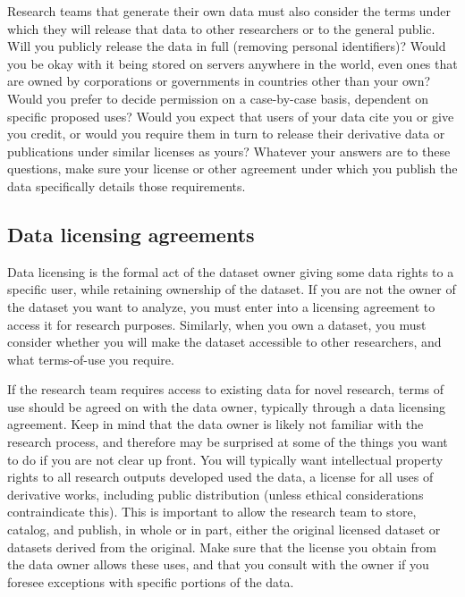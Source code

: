 Research teams that generate their own data must also consider the terms
under which they will release that data to other researchers or to the general public. 
Will you publicly release the data in full (removing personal identifiers)?
Would you be okay with it being stored on servers anywhere in the world,
even ones that are owned by corporations or governments in countries other than your own?
Would you prefer to decide permission on a case-by-case basis, dependent on specific proposed uses? 
Would you expect that users of your data cite you or give you credit,
or would you require them in turn to release
their derivative data or publications under similar licenses as yours?
Whatever your answers are to these questions,
make sure your license or other agreement
under which you publish the data
specifically details those requirements.

\subsection{Data licensing agreements}
Data licensing is the formal act of the dataset owner giving some data rights to a specific user,
while retaining ownership of the dataset.
If you are not the owner of the dataset you want to analyze,
you must enter into a licensing agreement to access it for research purposes.
Similarly, when you own a dataset,
you must consider whether you will make the dataset accessible to other researchers,
and what terms-of-use you require. 

If the research team requires access to existing data for novel research,
terms of use should be agreed on with the data owner, 
typically through a data licensing agreement.
Keep in mind that the data owner is likely not familiar
with the research process, and therefore may be surprised
at some of the things you want to do if you are not clear up front.
You will typically want intellectual property rights to all research outputs developed used the data,
a license for all uses of derivative works, including public distribution 
(unless ethical considerations contraindicate this).
This is important to allow the research team to store, catalog, and publish, in whole or in part,
either the original licensed dataset or datasets derived from the original.
Make sure that the license you obtain from the data owner allows these uses,
and that you consult with the owner if you foresee exceptions with specific portions of the data.

